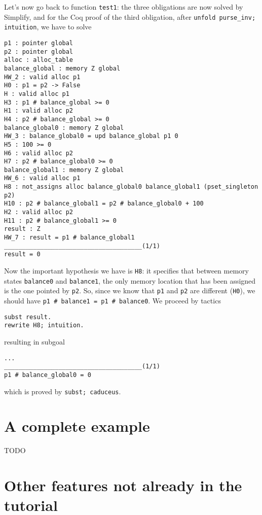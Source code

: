 \documentclass[12pt,a4paper,twoside,openright]{report}
\begin{document}
Let's now go back to function \verb|test1|: the three obligations are
now solved by Simplify, and for the Coq proof of the third obligation,
after \verb|unfold purse_inv; intuition|, we have to solve
\begin{verbatim}
p1 : pointer global
p2 : pointer global
alloc : alloc_table
balance_global : memory Z global
HW_2 : valid alloc p1
H0 : p1 = p2 -> False
H : valid alloc p1
H3 : p1 # balance_global >= 0
H1 : valid alloc p2
H4 : p2 # balance_global >= 0
balance_global0 : memory Z global
HW_3 : balance_global0 = upd balance_global p1 0
H5 : 100 >= 0
H6 : valid alloc p2
H7 : p2 # balance_global0 >= 0
balance_global1 : memory Z global
HW_6 : valid alloc p1
H8 : not_assigns alloc balance_global0 balance_global1 (pset_singleton p2)
H10 : p2 # balance_global1 = p2 # balance_global0 + 100
H2 : valid alloc p2
H11 : p2 # balance_global1 >= 0
result : Z
HW_7 : result = p1 # balance_global1
______________________________________(1/1)
result = 0
\end{verbatim}
Now the important hypothesis we have is \verb|H8|: it specifies that
between memory states \verb|balance0| and \verb|balance1|, the only
memory location that has been assigned is the one pointed by
\verb|p2|. So, since we know that \verb|p1| and \verb|p2| are different
(\verb|H0|), we should have \verb|p1 # balance1 = p1 # balance0|. We proceed
by tactics
\begin{verbatim}
subst result.
rewrite H8; intuition.
\end{verbatim}
resulting in subgoal
\begin{verbatim}
...
______________________________________(1/1)
p1 # balance_global0 = 0
\end{verbatim}
which is proved by \verb|subst; caduceus|.















\section{A complete example}

TODO







\section{Other features not already in the tutorial}
\end{document}
